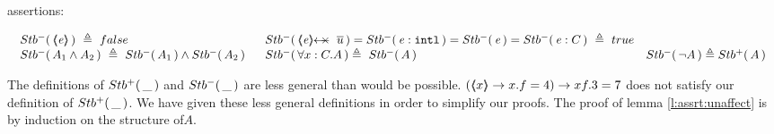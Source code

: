\begin{definition}
[$\Neg{\_}$] assertions:

$
\begin{array}{l}
 \begin{array}{lll}
  \Neg {\inside{\re}}\  \triangleq \    false &    \Neg {\protectedFrom \re {\overline {u}}} =  
  \Neg  {\internal \re} =   
    \Neg {\re}=   
     \Neg {\re:C}\   \triangleq \    true
\\ 
 \Neg  {A_1  \wedge  A_2}\  \triangleq\     \Neg  { A_1}  \wedge    \Neg  {A_2}   \ \   
 &    
 \Neg  {\forall x:C.A}   \triangleq\   \Neg A \ \ 
&
  \Neg {\neg A}  \triangleq \Pos A
 \end{array}
 \end{array}
$
\label{def:Neg}
\end{definition}

The definitions of ${Stb^+(\, \_\, )}$ and $\Neg {\_}$ are less  general than would be   possible. \Eg $(\langle\!\!\langle x \rangle\!\!\rangle \rightarrow  x.f=4) \rightarrow xf.3=7$  does not satisfy our definition of ${Stb^+(\, \_\, )}$.
We have given these less general definitions in order to simplify our proofs.
The proof of lemma \ref{l:assrt:unaffect} is by induction on the structure of$A$.

\vspace{.2cm}